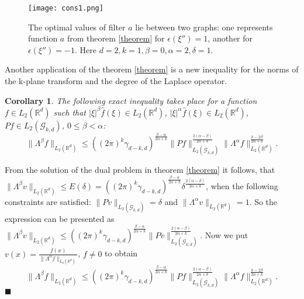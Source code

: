 \documentclass[12pt]{iopart}
\newtheorem{corollary}{Corollary}
\newenvironment{proof}
{\par\noindent{\bf Proof}}
{\hfill$\scriptstyle\blacksquare$}
\begin{document}
\begin{figure}[h]
\centering
\texttt{[image: cons1.png]}
\caption{The optimal values of filter $a$ lie between two graphs: one represents function $a$ from theorem \ref{theorem} for $\epsilon(\xi'')=1$, another for $\epsilon(\xi'')=-1$. Here $d=2, k=1, \beta=0, \alpha=2, \delta=1$.}
\label{pic1}
\end{figure}
Another application of the theorem \ref{theorem} is a new inequality for the norms of the k-plane transform and the degree of the Laplace operator.

\begin{corollary}
\label{cor2}
The following exact inequality takes place for a function $f\in L_2(\mathbb R^d)$ such that $|\xi|^\beta\widehat f(\xi)\in L_2(\mathbb R^d)$, $|\xi|^\alpha\widehat f(\xi)\in L_2(\mathbb R^d)$, $Pf\in L_2(\mathcal G_{k,d})$, $0\leqslant\beta<\alpha$:
\[
\|\Lambda^\beta f\|_{L_2(\mathbb R^d)}\leqslant
((2\pi)^k\gamma_{d-k,d})^{\frac{\beta-\alpha}{2\alpha+k}}\|Pf\|_{L_2(\mathcal G_{k,d})}^{\frac{2(\alpha-\beta)}{2\alpha+k}}\|\Lambda^\alpha f\|_{L_2(\mathbb
  R^d)}^\frac{k-2\beta}{2\alpha+k}.
\]
\end{corollary}

\begin{proof}
From the solution of the dual problem in theorem \ref{theorem} it follows, that \linebreak
 $\|\Lambda^\beta v\|_{L_2(\mathbb R^d)}\leqslant E(\delta)=
  ((2\pi)^k\gamma_{d-k,d})^{\frac{\beta-\alpha}{2\alpha+k}}\delta^{\frac{2(\alpha-\beta)}{2\alpha+k}}$, 
  when the following constraints are satisfied: $\|Pv\|_{L_2(\mathcal G_{k,d})}=\delta$ and
  $\|\Lambda^\alpha v\|_{L_2(\mathbb R^d)}=1$. So the expression can be presented as \linebreak
$\|\Lambda^\beta v\|_{L_2(\mathbb R^d)}\leqslant
  ((2\pi)^k\gamma_{d-k,d})^{\frac{\beta-\alpha}{2\alpha+k}}\|Pv\|_{L_2(\mathcal G_{k,d})}^{\frac{2(\alpha-\beta)}{2\alpha+k}}$.
 Now we put
 $v(x)=\frac{f(x)}{\|\Lambda^\alpha f\|_{L_2(\mathbb R^d)}}$, $f\ne 0$ to obtain
\[
\|\Lambda^\beta f\|_{L_2(\mathbb R^d)}\leqslant
((2\pi)^k\gamma_{d-k,d})^{\frac{\beta-\alpha}{2\alpha+k}}\|Pf\|_{L_2(\mathcal G_{k,d})}^{\frac{2(\alpha-\beta)}{2\alpha+k}}\|\Lambda^\alpha f\|_{L_2(\mathbb
  R^d)}^\frac{k-2\beta}{2\alpha+k}.
\]
\end{proof}
\end{document}
